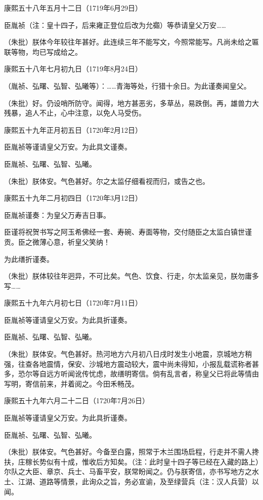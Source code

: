 \begin{bookquote}
康熙五十八年五月十二日（1719年6月29日）

臣胤祯（注：皇十四子，后来雍正登位后改为允禵）等恭请皇父万安……

（朱批）朕体今年较往年甚好。此连续三年不能写文，今照常能写。凡尚未给之匾联等物，均已写成给之。
\end{bookquote}

\begin{bookquote}
康熙五十八年七月初九日（1719年8月24日）

（胤祯、弘曙、弘智、弘曦等）：……青海等处，行猎十余日。为此谨奏闻皇父。

（朱批）好。仍设哨所防守。闻得，地方甚恶劣，多草丛，易跌倒。再，雄兽力大残暴，追人不止，心中注意，以免人马受伤。
\end{bookquote}

\begin{bookquote}
康熙五十九年正月初五日（1720年2月12日）

臣胤祯等谨请皇父万安。为此具文谨奏。

臣胤祯、弘曙、弘智、弘曦。

（朱批）朕体安。气色甚好。尔之太监仔细看视而归，或告之也。
\end{bookquote}

\begin{bookquote}
康熙五十九年二月初四日（1720年3月12日）

臣胤祯谨奏：为皇父万寿吉日事。

臣谨将祝贺书写之阿玉希佛经一套、寿碗、寿面等物，交付随臣之太监白镇世谨贡。臣之微薄心意，祈皇父笑纳！

为此缮折谨奏。

（朱批）朕体较往年迥异，不可比矣。气色、饮食、行走，尔太监亲见，朕勿庸多写……
\end{bookquote}

\begin{bookquote}
康熙五十九年六月初七日（1720年7月11日）

臣胤祯等谨请皇父万安。为此具折谨奏。

臣胤祯、弘曙、弘智、弘曦。

（朱批）朕体安。气色甚好。热河地方六月初八日戌时发生小地震，京城地方稍强，往查各地震情，保安、沙城地方震动较大，震中尚未得知，小报乱载谎称者甚多，恐尔等自远方听闻讹传忧虑，故缮明寄信。倘有乱言者，称皇父已将此等情由写明，寄信前来，并着阅之。今田禾畅茂。
\end{bookquote}

\begin{bookquote}
康熙五十九年六月二十二日（1720年7月26日）

臣胤祯等谨请皇父万安。为此具折谨奏。

臣胤祯、弘曙、弘智、弘曦。

（朱批）朕体安。气色甚好。今备至白露，照常于木兰围场启程，行走并不需人搀扶，庄稼长势似有十成，惟收后方知矣。（注：此时皇十四子等已经在入藏的路上）尔队之大臣、章京、兵士、马畜平安，朕常盼闻之。仍与朕寄信，亦书写地方之水土、江湖、道路等情景，此询众之旨，务必宣谕，及至绿营兵（注：汉人兵营）以闻。
\end{bookquote}

